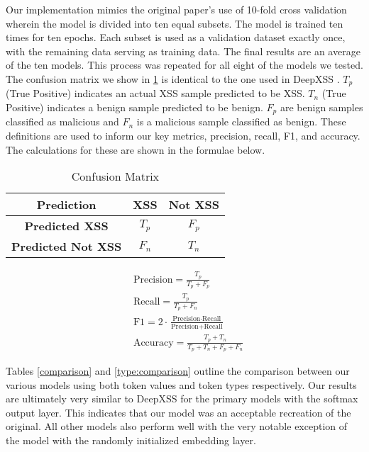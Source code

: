 Our implementation mimics the original paper’s use of 10-fold cross validation wherein the model is divided into ten equal subsets.  The model is trained ten times for ten epochs.  Each subset is used as a validation dataset exactly once, with the remaining data serving as training data.  The final results are an average of the ten models.  This process was repeated for all eight of the models we tested.
The confusion matrix we show in \ref{conf-mat} is identical to the one used in DeepXSS \cite{fang2018deepxss}. $T_p$ (True Positive) indicates an actual XSS sample predicted to be XSS. $T_n$ (True Positive) indicates a benign sample predicted to be benign. $F_p$ are benign samples classified as malicious and $F_n$ is a malicious sample classified as benign.  These definitions are used to inform our key metrics, precision, recall, F1, and accuracy.  The calculations for these are shown in the formulae below.

\begin{table}
\begin{center}
\begingroup
\setlength{\tabcolsep}{10pt} %
\renewcommand{\arraystretch}{1.5} %
\begin{tabular}{|| c | c | c ||} 
    \hline
    Prediction & XSS & Not XSS \\ 
    \hline\hline
    \textbf{Predicted XSS} &  $T_p$ & $F_p$ \\ 
    \hline
    \textbf{Predicted Not XSS} & $F_n$ & $T_n$ \\
    \hline
\end{tabular}
\endgroup
\caption{\label{conf-mat}Confusion Matrix}
\end{center}
\end{table}


\begin{align*}
    &\text{Precision} = \frac{T_p}{T_p + F_p} \\[10pt]
    &\text{Recall} = \frac{T_p}{T_p + F_n} \\[10pt]
    &\text{F1} = 2 \cdot \frac{\text{Precision} \cdot \text{Recall}}{\text{Precision} + \text{Recall}}\\[10pt]
    &\text{Accuracy} = \frac{T_p + T_n}{T_p + T_n + F_p + F_n}
\end{align*}

Tables \ref{comparison} and \ref{type:comparison} outline the comparison between our various models using both token values and token types respectively.  Our results are ultimately very similar to DeepXSS \cite{fang2018deepxss} for the primary models with the softmax output layer.  This indicates that our model was an acceptable recreation of the original. All other models also perform well with the very notable exception of the model with the randomly initialized embedding layer.

